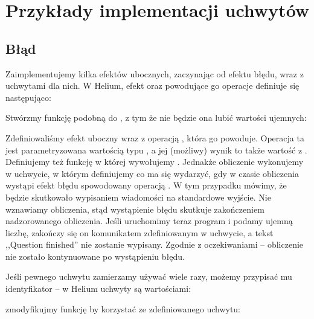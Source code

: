 \section{Przykłady implementacji uchwytów}


\subsection{Błąd}

Zaimplementujemy kilka efektów ubocznych, zaczynając od efektu błędu, wraz z uchwytami dla nich. W Helium, efekt oraz powodujące go operacje definiuje się następująco:



Stwórzmy funkcję podobną do , z tym że nie będzie ona lubić wartości ujemnych:



Zdefiniowaliśmy efekt uboczny  wraz z operacją , która go powoduje. Operacja ta jest parametryzowana wartością typu , a jej (możliwy) wynik to także wartość z . Definiujemy też funkcję  w której wywołujemy . Jednakże obliczenie wykonujemy w uchwycie, w którym definiujemy co ma się wydarzyć, gdy w czasie obliczenia wystąpi efekt błędu spowodowany operacją . W tym przypadku mówimy, że będzie skutkowało wypisaniem wiadomości na standardowe wyjście. Nie wznawiamy obliczenia, stąd wystąpienie błędu skutkuje zakończeniem nadzorowanego obliczenia. Jeśli uruchomimy teraz program i podamy ujemną liczbę, zakończy się on komunikatem zdefiniowanym w uchwycie, a tekst ,,Question finished'' nie zostanie wypisany. Zgodnie z oczekiwaniami -- obliczenie  nie zostało kontynuowane po wystąpieniu błędu.

Jeśli pewnego uchwytu zamierzamy używać wiele razy, możemy przypisać mu identyfikator -- w Helium uchwyty są wartościami:



zmodyfikujmy funkcję  by korzystać ze zdefiniowanego uchwytu:




